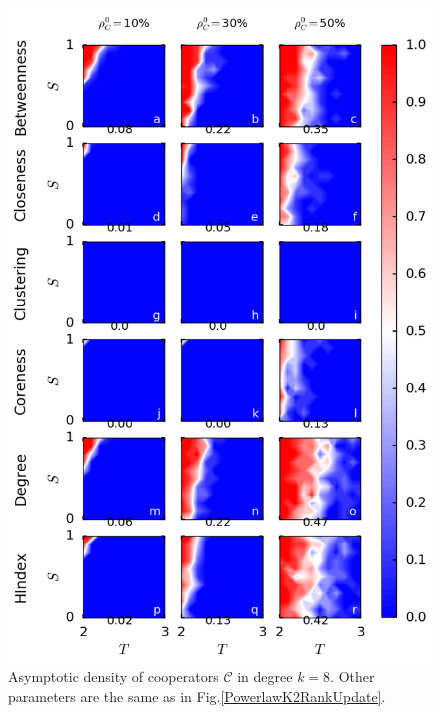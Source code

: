 \documentclass[preprint,12pt,3p]{elsarticle}
\begin{document}
\begin{figure}[htbp]
\centering
\includegraphics[width=13cm]{PowerlawK8RankUpdate.png}
\caption{Asymptotic density of cooperators $\mathcal{C}$ in degree $k=8$.
Other parameters are the same as in Fig.\ref{PowerlawK2RankUpdate}.}
\label{PowerlawK8RankUpdate}
\end{figure}
\end{document}
